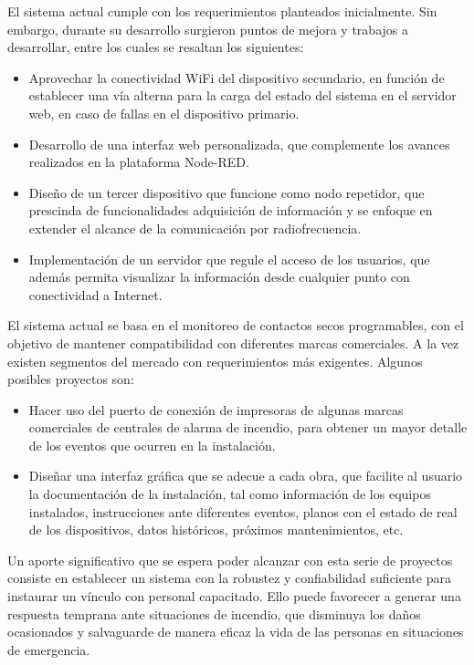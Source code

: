 El sistema actual cumple con los requerimientos planteados inicialmente. Sin embargo, durante su desarrollo surgieron puntos de mejora y trabajos a desarrollar, entre los cuales se resaltan los siguientes:

\begin{itemize}
\item Aprovechar la conectividad WiFi del dispositivo secundario, en función de establecer una vía alterna para la carga del estado del sistema en el servidor web, en caso de fallas en el dispositivo primario.
\item Desarrollo de una interfaz web personalizada, que complemente los avances realizados en la plataforma Node-RED. 
\item Diseño de un tercer dispositivo que funcione como nodo repetidor, que prescinda de funcionalidades adquisición de información y se enfoque en extender el alcance de la comunicación por radiofrecuencia.    
\item Implementación de un servidor que regule el acceso de los usuarios, que además permita visualizar la información desde cualquier punto con conectividad a Internet.
\end{itemize}

El sistema actual se basa en el monitoreo de contactos secos programables, con el objetivo de mantener compatibilidad con diferentes marcas comerciales. A la vez existen segmentos del mercado con requerimientos más exigentes. Algunos posibles proyectos son:


\begin{itemize}
\item Hacer uso del puerto de conexión de impresoras de algunas marcas comerciales de centrales de alarma de incendio, para obtener un mayor detalle de los eventos que ocurren en la instalación.
\item Diseñar una interfaz gráfica que se adecue a cada obra, que facilite al usuario la documentación de la instalación, tal como información de los equipos instalados, instrucciones ante diferentes eventos, planos con el estado de real de los dispositivos, datos históricos, próximos mantenimientos, etc.
\end{itemize}

Un aporte significativo que se espera poder alcanzar con esta serie de proyectos consiste en establecer un sistema con la robustez y confiabilidad suficiente para instaurar un vínculo con personal capacitado. Ello puede favorecer a generar una respuesta temprana ante situaciones de incendio, que disminuya los daños ocasionados y salvaguarde de manera eficaz la vida de las personas en situaciones de emergencia. 

